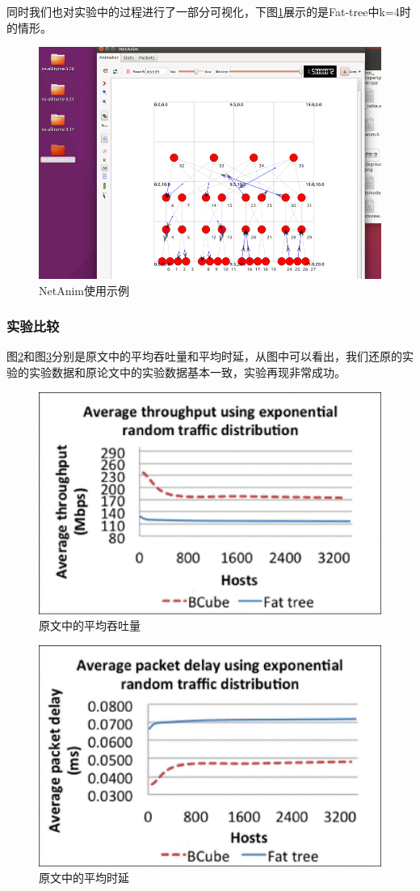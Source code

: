 \documentclass[lang=cn,11pt,a4paper,cite=authoryear]{elegantpaper}
\begin{document}
同时我们也对实验中的过程进行了一部分可视化，下图\ref{fig:NetAnim}展示的是Fat-tree中k=4时的情形。

\begin{figure}[htbp]
	\centering
	\includegraphics[width=0.7\linewidth]{image/screenshot056}
	\caption{NetAnim使用示例}
	\label{fig:NetAnim}
\end{figure}

\subsubsection{实验比较}

图\ref{fig:screenshot057}和图\ref{fig:screenshot058}分别是原文中的平均吞吐量和平均时延，从图中可以看出，我们还原的实验的实验数据和原论文中的实验数据基本一致，实验再现非常成功。

\begin{figure}[htbp]
	\centering
	\includegraphics[width=0.7\linewidth]{image/img2.jpg}
	\caption{原文中的平均吞吐量}
	\label{fig:screenshot057}
\end{figure}


\begin{figure}[htbp]
	\centering
	\includegraphics[width=0.7\linewidth]{image/img1.jpg}
	\caption{原文中的平均时延}
	\label{fig:screenshot058}
\end{figure}
\end{document}
